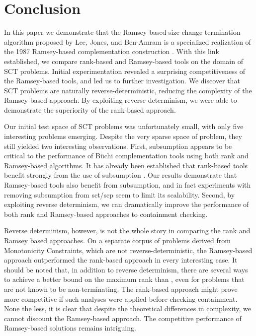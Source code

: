 \documentclass{LMCS}
\newcommand\buchi{B\"uchi }
\begin{document}
\section{Conclusion}\label{Sect:Conclusion}
In this paper we demonstrate that the Ramsey-based size-change
termination algorithm proposed by Lee, Jones, and Ben-Amram \cite{LJB01} is a
specialized realization of the 1987 Ramsey-based complementation construction
\cite{Buc62,SVW85}.  With this link established, we compare rank-based and
Ramsey-based tools on the domain of SCT problems. Initial experimentation
revealed a surprising competitiveness of the Ramsey-based tools, and led us to
further investigation. We discover that SCT problems are naturally
reverse-deterministic, reducing the complexity of the Ramsey-based approach. By
exploiting reverse determinism, we were able to demonstrate the superiority of
the rank-based approach.

Our initial test space of SCT problems was unfortunately small, with only five
interesting problems emerging. Despite the very sparse space of problem, they
still yielded two interesting observations. First, subsumption appears to be
critical to the performance of \buchi complementation tools using both rank and
Ramsey-based algorithms. It has already been established that rank-based tools
benefit strongly from the use of subsumption \cite{DR07}. Our results
demonstrate that Ramsey-based tools also benefit from subsumption, and in fact
experiments with removing subsumption from sct/scp seem to limit its
scalability. Second, by exploiting reverse determinism, we can dramatically
improve the performance of both rank and Ramsey-based approaches to containment
checking.

Reverse determinism, however, is not the whole story in comparing the rank and
Ramsey based approaches. On a separate corpus of problems derived from Monotonicity Constraints,
which are not reverse-deterministic, the Ramsey-based approach outperformed the rank-based
approach in every interesting case. It should be noted that, in addition to
reverse determinism, there are several ways to achieve a better bound on the
maximum rank than  \cite{FKV04, GKSV03}, even for problems that are not
known to be non-terminating. The rank-based approach might prove more competitive if such analyses
were applied before checking containment. None the less, it is clear that despite the theoretical
differences in complexity, we cannot discount the Ramsey-based approach. The competitive performance
of Ramsey-based solutions remains intriguing. 
\end{document}
